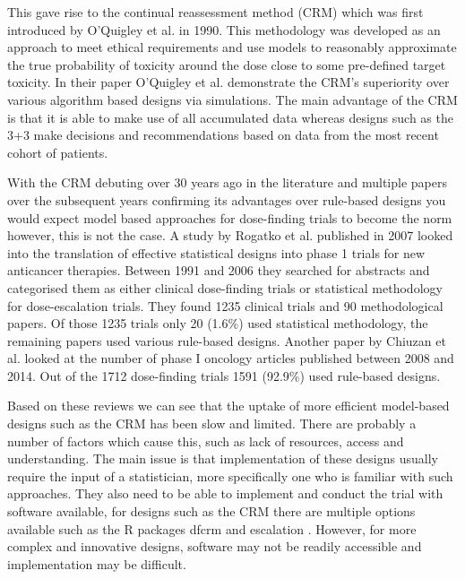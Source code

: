 This gave rise to the continual reassessment method (CRM) which was first introduced by O'Quigley et al. \cite{oquigleyContinualReassessmentMethod1990} in 1990. This methodology was developed as an approach to meet ethical requirements and use models to reasonably approximate the true probability of toxicity around the dose close to some pre-defined target toxicity. In their paper O'Quigley et al. \cite{oquigleyContinualReassessmentMethod1990} demonstrate the CRM's superiority over various algorithm based designs via simulations. The main advantage of the CRM is that it is able to make use of all accumulated data whereas designs such as the 3+3 make decisions and recommendations based on data from the most recent cohort of patients.

With the CRM debuting over 30 years ago in the literature and multiple papers over the subsequent years confirming its advantages over rule-based designs you would expect model based approaches for dose-finding trials to become the norm however, this is not the case. A study by Rogatko et al. \cite{rogatkoTranslationInnovativeDesigns2007} published in 2007 looked into the translation of effective statistical designs into phase 1 trials for new anticancer therapies. Between 1991 and 2006 they searched for abstracts and categorised them as either clinical dose-finding trials or statistical methodology for dose-escalation trials. They found 1235 clinical trials and 90 methodological papers. Of those 1235 trials only 20 (1.6\%) used statistical methodology, the remaining papers used various rule-based designs. Another paper by Chiuzan et al. \cite{chiuzanDosefindingDesignsTrials2017} looked at the number of phase \RN{1} oncology articles published between 2008 and 2014. Out of the 1712 dose-finding trials 1591 (92.9\%) used rule-based designs. 

Based on these reviews we can see that the uptake of more efficient model-based designs such as the CRM has been slow and limited. There are probably a number of factors which cause this, such as lack of resources, access and understanding. The main issue is that implementation of these designs usually require the input of a statistician, more specifically one who is familiar with such approaches. They also need to be able to implement and conduct the trial with software available, for designs such as the CRM there are multiple options available such as the R packages dfcrm \cite{cheungDfcrmDoseFindingContinual2019} and escalation \cite{brockModularApproachDose2020}. However, for more complex and innovative designs, software may not be readily accessible and implementation may be difficult.


